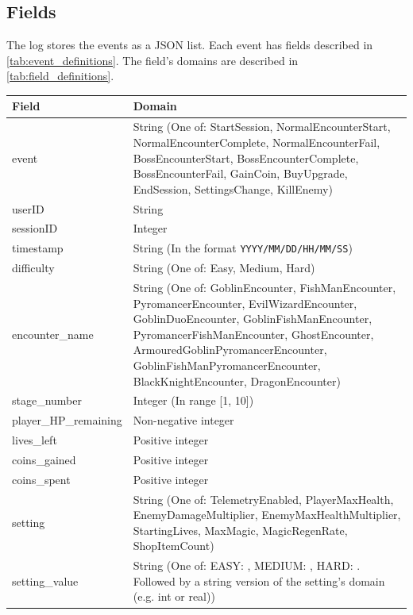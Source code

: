 \documentclass[11pt]{article}
\begin{document}
\subsection{Fields}
The log stores the events as a JSON list. Each event has fields described in \ref{tab:event_definitions}. The field's domains are described in \ref{tab:field_definitions}.
\begin{table}[H]
  \begin{center}
    \begin{tabularx}{\textwidth}{
        | >{\centering\arraybackslash\hsize=0.25\hsize}X
      | >{\centering\arraybackslash\hsize=0.75\hsize}X |}
      \hline
      \textbf{Field} & \textbf{Domain}  \\
      \hline
      event & String (One of: StartSession, NormalEncounterStart, NormalEncounterComplete, NormalEncounterFail, BossEncounterStart, BossEncounterComplete, BossEncounterFail, GainCoin, BuyUpgrade, EndSession, SettingsChange, KillEnemy)  \\
      \hline
      userID & String \\
      \hline
      sessionID & Integer \\
      \hline
      timestamp & String (In the format \verb|YYYY/MM/DD/HH/MM/SS|) \\
      \hline
      difficulty & String (One of: Easy, Medium, Hard) \\
      \hline
      encounter\_name & String (One of: GoblinEncounter, FishManEncounter, PyromancerEncounter, EvilWizardEncounter, GoblinDuoEncounter, GoblinFishManEncounter, PyromancerFishManEncounter, GhostEncounter, ArmouredGoblinPyromancerEncounter, GoblinFishManPyromancerEncounter, BlackKnightEncounter, DragonEncounter) \\
      \hline
      stage\_number & Integer (In range [1, 10]) \\
      \hline
      player\_HP\_remaining & Non-negative integer \\
      \hline
      lives\_left & Positive integer \\
      \hline
      coins\_gained & Positive integer \\
      \hline
      coins\_spent & Positive integer \\
      \hline
      setting & String (One of: TelemetryEnabled, PlayerMaxHealth, EnemyDamageMultiplier, EnemyMaxHealthMultiplier, StartingLives, MaxMagic, MagicRegenRate, ShopItemCount) \\
      \hline
      setting\_value & String (One of: EASY: , MEDIUM: , HARD: . Followed by a string version of the setting's domain (e.g. int or real)) \\

\end{tabularx}
\end{center}
\end{table}
\end{document}
